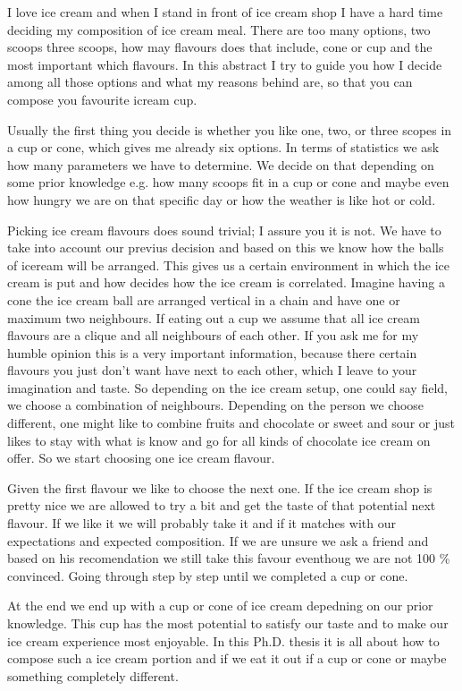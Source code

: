 I love ice cream and when I stand in front of ice cream shop I have a hard time deciding my composition of ice cream meal.
There are too many options, two scoops three scoops, how may flavours does that include, cone or cup and the most important which flavours.
In this abstract I try to guide you how I decide among all those options and what my reasons behind are, so that you can compose you favourite icream cup.


Usually the first thing you decide is whether you like one, two, or three scopes in a cup or cone, which gives me already six options.
In terms of statistics we ask how many parameters we have to determine.
We decide on that depending on some prior knowledge e.g. how many scoops fit in a cup or cone and maybe even how hungry we are on that specific day or how the weather is like hot or cold.

Picking ice cream flavours does sound trivial; I assure you it is not.
We have to take into account our previus decision and based on this we know how the balls of iceream will be arranged.
This gives us a certain environment in which the ice cream is put and how decides how the ice cream is correlated.
Imagine having a cone the ice cream ball are arranged vertical in a chain and have one or maximum two neighbours.
If eating out a cup we assume that all ice cream flavours are a clique and all neighbours of each other.
If you ask me for my humble opinion this is a very important information, because there certain flavours you just don't want have next to each other, which I leave to your imagination and taste.
So depending on the ice cream setup, one could say field, we choose a combination of neighbours.
Depending on the person we choose different, one might like to combine fruits and chocolate or sweet and sour or just likes to stay with what is know and go for all kinds of chocolate ice cream on offer.
So we start choosing one ice cream flavour.

Given the first flavour we like to choose the next one.
If the ice cream shop is pretty nice we are allowed to try a bit and get the taste of that potential next flavour.
If we like it we will probably take it and if it matches with our expectations and expected composition.
If we are unsure we ask a friend and based on his recomendation we still take this favour eventhoug we are not 100 \% convinced.
Going through step by step until we completed a cup or cone.

At the end we end up with a cup or cone of ice cream depedning on our prior knowledge.
This cup has the most potential to satisfy our taste and to make our ice cream experience most enjoyable.
In this Ph.D. thesis it is all about how to compose such a ice cream portion and if we eat it out if a cup or cone or maybe something completely different.


